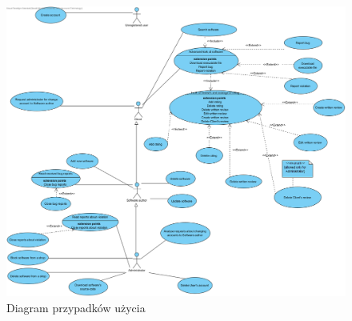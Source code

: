 \documentclass[12pt,a4paper]{article}
\begin{document}
\begin{figure}[H]
    \centering
    \centerline{
    \includegraphics[width=1.35\textwidth]{Diagram przypadków użycia.png}
    }
    \caption{Diagram przypadków użycia}
    \label{fig:diagram_przypadkow}
\end{figure}
\end{document}
